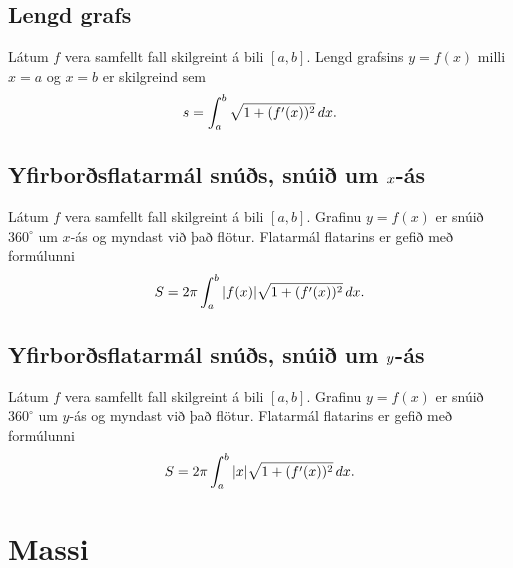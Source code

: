 \documentclass[b5paper,10pt,icelandic]{sphinxmanual}
\begin{document}
\subsection{Lengd grafs}
\label{kafli07:lengd-grafs}
Látum \(f\) vera samfellt fall skilgreint á bili \([a, b]\).
Lengd grafsins \(y=f(x)\) milli \(x=a\) og \(x=b\) er
skilgreind sem
\begin{gather}
\begin{split}s=\int_a^b\sqrt{1+(f'(x))^2}\,dx.\end{split}\notag
\end{gather}

\subsection{Yfirborðsflatarmál snúðs, snúið um \protect\(x\protect\)-ás}
\label{kafli07:index-7}\label{kafli07:yfirborsflatarmal-snus-snui-um-as}
Látum \(f\) vera samfellt fall skilgreint á bili \([a, b]\).
Grafinu \(y=f(x)\) er snúið \(360^\circ\) um \(x\)-ás og
myndast við það flötur. Flatarmál flatarins er gefið með formúlunni
\begin{gather}
\begin{split}S=2\pi\int_a^b|f(x)|\sqrt{1+(f'(x))^2}\,dx.\end{split}\notag
\end{gather}

\subsection{Yfirborðsflatarmál snúðs, snúið um \protect\(y\protect\)-ás}
\label{kafli07:index-8}\label{kafli07:id3}
Látum \(f\) vera samfellt fall skilgreint á bili \([a, b]\).
Grafinu \(y=f(x)\) er snúið \(360^\circ\) um \(y\)-ás og
myndast við það flötur. Flatarmál flatarins er gefið með formúlunni
\begin{gather}
\begin{split}S=2\pi\int_a^b|x|\sqrt{1+(f'(x))^2}\,dx.\end{split}\notag
\end{gather}

\section{Massi}
\label{kafli07:massi}\label{kafli07:index-9}
\end{document}
